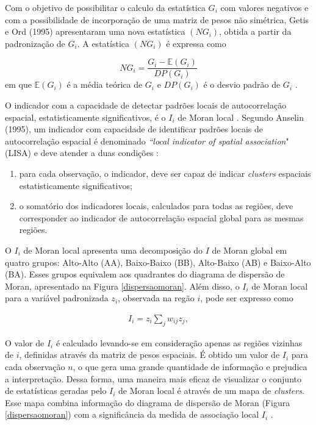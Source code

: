 \documentclass[
	12pt,				%
	openright,			%
	oneside,			%
	a4paper,			%
	chapter=TITLE,		%
	section=TITLE,		%
	english,			%
	french,				%
	spanish,			%
	brazil				%
	]{abntex2}
\begin{document}
Com o objetivo de possibilitar o calculo da estatística $G_i$ com valores negativos e com a possibilidade de incorporação de uma matriz de pesos não simétrica, Getis e Ord (1995) apresentaram uma nova estatística $(NG_i)$, obtida a partir da padronização de $G_i$. A estatística $(NG_i)$ é expressa como  

\begin{equation}
	NG_i = \dfrac{G_i-\mathbb{E}(G_i)}{DP(G_i)}
\end{equation}
\noindent em que $\mathbb{E}(G_i)$ é a média teórica de $G_i$ e $DP(G_i)$ é o desvio padrão de $G_i$ \cite{almeida12}.



O indicador com a capacidade de detectar padrões locais de autocorrelação espacial, estatisticamente significativos, é o $I_i$ de Moran local \cite{almeida12}. Segundo Anselin (1995), um indicador com capacidade de identificar padrões locais de autocorrelação espacial é denominado \textit{``local indicator of spatial association}" (LISA) e deve atender a duas condições \cite{anselin95}: 

\begin{enumerate}
	\item para cada observação, o indicador, deve ser capaz de indicar \textit{clusters} espaciais estatisticamente significativos;
	\item o somatório dos indicadores locais, calculados para todas as regiões, deve corresponder ao indicador de autocorrelação espacial global para as mesmas regiões.
\end{enumerate}

O $I_i$ de Moran local apresenta uma decomposição do $I$ de Moran global em quatro grupos: Alto-Alto (AA), Baixo-Baixo (BB), Alto-Baixo (AB) e  Baixo-Alto (BA). Esses grupos equivalem aos quadrantes do diagrama de dispersão de Moran, apresentado na Figura \ref{dispersaomoran}. Além disso, o $I_i$ de Moran local para a variável padronizada $z_i$, observada na regão $i$, pode ser expresso como 

\begin{align*}
I_i = z_i \sum_{j}^{} w_{ij} z_j,
\end{align*}

O valor de $I_i$ é calculado levando-se em consideração apenas as regiões vizinhas de $i$, definidas através da matriz de pesos espaciais. É obtido um valor de $I_i$ para cada observação $n$, o que gera uma grande quantidade de informação e prejudica a interpretação. Dessa forma, uma maneira mais eficaz de visualizar o conjunto de estatísticas geradas pelo $I_i$ de Moran local é através de um mapa de \textit{clusters}. Esse mapa combina informação do diagrama de dispersão de Moran (Figura \ref{dispersaomoran}) com a significância da medida de associação local $I_i$ \cite{almeida12}. 
\end{document}
